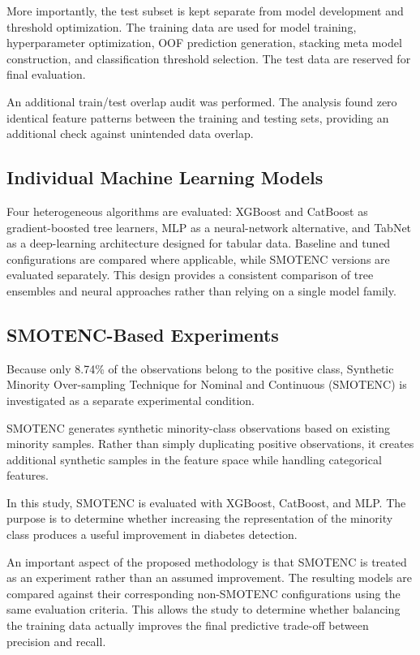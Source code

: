 \documentclass[conference]{IEEEtran}
\begin{document}
More importantly, the test subset is kept separate from model development and threshold optimization. The training data are used for model training, hyperparameter optimization, OOF prediction generation, stacking meta model construction, and classification threshold selection. The test data are reserved for final evaluation.

An additional train/test overlap audit was performed. The analysis found zero identical feature patterns between the training and testing sets, providing an additional check against unintended data overlap.
\subsection{Individual Machine Learning Models}

Four heterogeneous algorithms are evaluated: XGBoost and CatBoost as gradient-boosted tree learners, MLP as a neural-network alternative, and TabNet as a deep-learning architecture designed for tabular data. Baseline and tuned configurations are compared where applicable, while SMOTENC versions are evaluated separately. This design provides a consistent comparison of tree ensembles and neural approaches rather than relying on a single model family.

\subsection{SMOTENC-Based Experiments}

Because only 8.74\% of the observations belong to the positive class, Synthetic Minority Over-sampling Technique for Nominal and Continuous (SMOTENC) is investigated as a separate experimental condition.

SMOTENC generates synthetic minority-class observations based on existing minority samples. Rather than simply duplicating positive observations, it creates additional synthetic samples in the feature space while handling categorical features.

In this study, SMOTENC is evaluated with XGBoost, CatBoost, and MLP. The purpose is to determine whether increasing the representation of the minority class produces a useful improvement in diabetes detection.

An important aspect of the proposed methodology is that SMOTENC is treated as an experiment rather than an assumed improvement. The resulting models are compared against their corresponding non-SMOTENC configurations using the same evaluation criteria. This allows the study to determine whether balancing the training data actually improves the final predictive trade-off between precision and recall.
\end{document}
